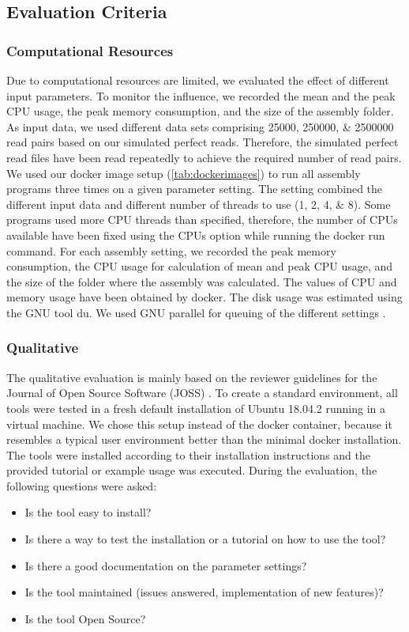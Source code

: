 \documentclass{bmcart}
\begin{document}
\subsection*{Evaluation Criteria}
\subsubsection*{Computational Resources}
Due to computational resources are limited, we evaluated the effect of different input parameters.
To monitor the influence, we recorded the mean and the peak CPU usage, the peak memory consumption, and the size of the assembly folder. 
As input data, we used different data sets comprising \numlist{25000;250000;2500000} read pairs based on our simulated perfect reads.
Therefore, the simulated perfect read files have been read repeatedly to achieve the required number of read pairs.
We used our docker image setup (\cref{tab:dockerimages}) to run all assembly programs three times on a given parameter setting.
The setting combined the different input data and different number of threads to use (\numlist{1;2;4;8}).
Some programs used more CPU threads than specified, therefore, the number of CPUs available have been fixed using the CPUs option while running the docker run command.
For each assembly setting, we recorded the peak memory consumption, the CPU usage for calculation of mean and peak CPU usage, and the size of the folder where the assembly was calculated.
The values of CPU and memory usage have been obtained by docker.
The disk usage was estimated using the GNU tool du.
We used GNU parallel for queuing of the different settings \cite{Tange2011a}.

\subsubsection*{Qualitative}

The qualitative evaluation is mainly based on the reviewer guidelines for the Journal of Open Source Software (JOSS) \cite{joss}.
To create a standard environment, all tools were tested in a fresh default installation of Ubuntu 18.04.2 running in a virtual machine. We chose this setup instead of the docker container, because it resembles a typical user environment better than the minimal docker installation. The tools were installed according to their installation instructions and
the provided tutorial or example usage was executed. During the evaluation, the following
questions were asked:

\begin{itemize}
    \item Is the tool easy to install? 
    \item Is there a way to test the installation or a tutorial on how to use the tool? 
    \item Is there a good documentation on the parameter settings? 
    \item Is the tool maintained (issues answered, implementation of new features)? 
    \item Is the tool Open Source?
\end{itemize}
\end{document}
